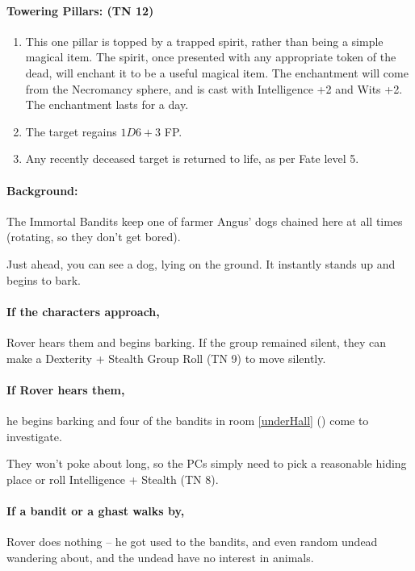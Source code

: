 \begin{multicols}{2}
\paragraph{Towering Pillars: (TN 12)}

\begin{enumerate}

  \item{This one pillar is topped by a trapped spirit, rather than being a simple magical item.  The spirit, once presented with any appropriate token of the dead, will enchant it to be a useful magical item.  The enchantment will come from the Necromancy sphere, and is cast with Intelligence +2 and Wits +2.  The enchantment lasts for a day.}
  \item{The target regains $1D6+3$ FP.}
  \item{Any recently deceased target is returned to life, as per Fate level 5.}

\end{enumerate}


\paragraph{Background:}
The Immortal Bandits keep one of farmer Angus' dogs chained here at all times (rotating, so they don't get bored).

\begin{boxtext}

  Just ahead, you can see a dog, lying on the ground.
  It instantly stands up and begins to bark.

\end{boxtext}

\paragraph{If the characters approach,}
Rover hears them and begins barking.
If the group remained silent, they can make a Dexterity + Stealth Group Roll (TN 9) to move silently.

\paragraph{If Rover hears them,}
he begins barking and four of the bandits in room \ref{underHall} () come to investigate.

They won't poke about long, so the PCs simply need to pick a reasonable hiding place or roll Intelligence + Stealth (TN 8).

\paragraph{If a bandit or a ghast walks by,}
Rover does nothing -- he got used to the bandits, and even random undead wandering about, and the undead have no interest in animals.


\vfill\null

\end{multicols}
